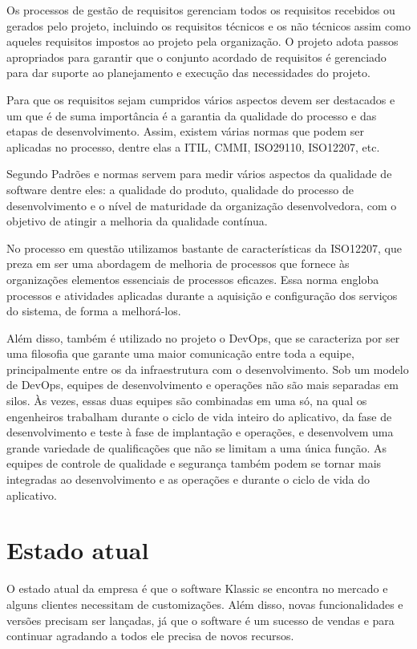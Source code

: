 \documentclass[	DIV=calc,%
							paper=a4,%
							fontsize=12pt,%
							onecolumn]{scrartcl}	 					%
\begin{document}
Os processos de gestão de requisitos gerenciam todos os requisitos
recebidos ou gerados pelo projeto, incluindo os requisitos técnicos e os
não técnicos assim como aqueles requisitos impostos ao projeto pela
organização. O projeto adota passos apropriados para garantir que o conjunto
acordado de requisitos é gerenciado para dar suporte ao planejamento
e execução das necessidades do projeto.

Para que os requisitos sejam cumpridos vários aspectos devem ser destacados e um que é 
de suma importância é a garantia da qualidade do processo e das etapas de desenvolvimento. Assim, existem várias normas que podem ser aplicadas
no processo, dentre elas a ITIL, CMMI, ISO29110, ISO12207, etc.

Segundo \cite{ref1} Padrões e normas servem para medir vários aspectos da qualidade de software dentre eles: a qualidade do produto, qualidade do processo de desenvolvimento e o nível de maturidade da organização desenvolvedora, com o objetivo de atingir a melhoria da qualidade contínua.

No processo em questão utilizamos bastante de características da ISO12207, que preza em ser uma abordagem de melhoria de processos que fornece às organizações elementos essenciais de processos eficazes.  Essa norma engloba processos e atividades aplicadas durante a aquisição e configuração dos serviços do sistema, de forma a melhorá-los.

Além disso, também é utilizado no projeto o DevOps, que se caracteriza por ser uma filosofia que garante uma maior comunicação entre toda a equipe, principalmente entre os da infraestrutura com o desenvolvimento. Sob um modelo de DevOps, equipes de desenvolvimento e operações não são mais separadas em silos. Às vezes, essas duas equipes são combinadas em uma só, na qual os engenheiros trabalham durante o ciclo de vida inteiro do aplicativo, da fase de desenvolvimento e teste à fase de implantação e operações, e desenvolvem uma grande variedade de qualificações que não se limitam a uma única função. As equipes de controle de qualidade e segurança também podem se tornar mais integradas ao desenvolvimento e as operações e durante o ciclo de vida do aplicativo.

\section{Estado atual}
O estado atual da empresa é que o software Klassic se encontra no mercado e alguns clientes necessitam de customizações. Além disso, novas funcionalidades e versões precisam ser lançadas, já que o software é um sucesso de vendas e para continuar agradando a todos ele precisa 
de novos recursos.
\end{document}
